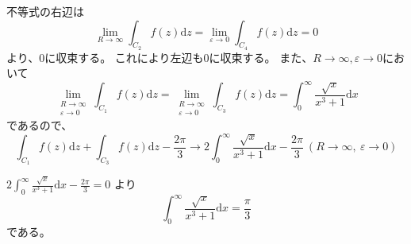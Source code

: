 \documentclass[12pt,b5paper]{ltjsarticle}
\begin{document}
不等式の右辺は
\begin{equation}
 \lim_{R\to\infty}\int_{C_2} f(z)\mathrm{d}z=
 \lim_{\varepsilon\to 0}\int_{C_4}f(z)\mathrm{d}z=0
\end{equation}
より、$0$に収束する。
これにより左辺も$0$に収束する。
また、$R\to\infty,\varepsilon\to 0$において
\begin{equation}
 \lim_{\substack{R \to \infty \\ \varepsilon \to 0}}\int_{C_1} f(z)\mathrm{d}z
  =
 \lim_{\substack{R \to \infty \\ \varepsilon \to 0}}\int_{C_3} f(z)\mathrm{d}z
 =
 \int_{0}^{\infty} \frac{\sqrt{x}}{x^3+1}\mathrm{d}x
\end{equation}
であるので、
\begin{equation}
  \int_{C_1} f(z)\mathrm{d}z
 +
 \int_{C_3} f(z)\mathrm{d}z
 - \frac{2\pi}{3}
\to
2\int_{0}^{\infty} \frac{\sqrt{x}}{x^3+1}\mathrm{d}x
 - \frac{2\pi}{3}
\ (R \to \infty ,\ \varepsilon \to 0)
\end{equation}

$2\int_{0}^{\infty} \frac{\sqrt{x}}{x^3+1}\mathrm{d}x
 - \frac{2\pi}{3}
=0$
より
\begin{equation}
 \int_{0}^{\infty} \frac{\sqrt{x}}{x^3+1}\mathrm{d}x
=\frac{\pi}{3}
\end{equation}
である。

\hrulefill
\end{document}
